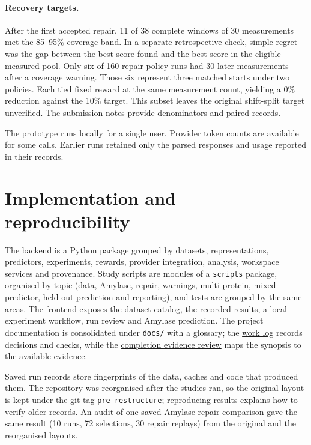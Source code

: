 \documentclass[11pt,a4paper]{article}
\begin{document}
\paragraph{Recovery targets.} After the first accepted repair, 11 of 38 complete windows of 30 measurements met the 85--95\% coverage band. In a separate retrospective check, simple regret was the gap between the best score found and the best score in the eligible measured pool. Only six of 160 repair-policy runs had 30 later measurements after a coverage warning. Those six represent three matched starts under two policies. Each tied fixed reward at the same measurement count, yielding a 0\% reduction against the 10\% target. This subset leaves the original shift-split target unverified. The \href{../docs/overview/submission_readiness.md}{submission notes} provide denominators and paired records.

The prototype runs locally for a single user. Provider token counts are available for some calls. Earlier runs retained only the parsed responses and usage reported in their records.

\section{Implementation and reproducibility}
The backend is a Python package grouped by datasets, representations, predictors, experiments, rewards, provider integration, analysis, workspace services and provenance. Study scripts are modules of a \texttt{scripts} package, organised by topic (data, Amylase, repair, warnings, multi-protein, mixed predictor, held-out prediction and reporting), and tests are grouped by the same areas. The frontend exposes the dataset catalog, the recorded results, a local experiment workflow, run review and Amylase prediction. The project documentation is consolidated under \texttt{docs/} with a glossary; the \href{../docs/history/work_log.md}{work log} records decisions and checks, while the \href{../docs/overview/completion_review.md}{completion evidence review} maps the synopsis to the available evidence.

Saved run records store fingerprints of the data, caches and code that produced them. The repository was reorganised after the studies ran, so the original layout is kept under the git tag \texttt{pre-restructure}; \href{../docs/overview/reproducing_results.md}{reproducing results} explains how to verify older records. An audit of one saved Amylase repair comparison gave the same result (10 runs, 72 selections, 30 repair replays) from the original and the reorganised layouts.
\end{document}
